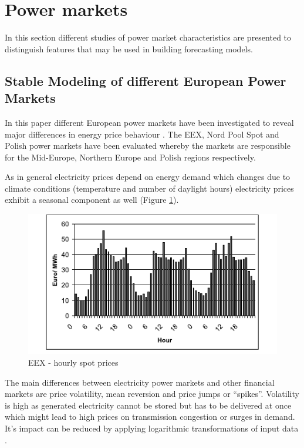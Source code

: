 
\section{Power markets}

In this section different studies of power market characteristics are presented to distinguish features that may be used in building forecasting models. 

\subsection{Stable Modeling of different European Power Markets}

In this paper different European power markets have been investigated to reveal major differences in energy price behaviour \cite{mugele2005stable}. The EEX, Nord Pool Spot and Polish power markets have been evaluated whereby the markets are responsible for the Mid-Europe, Northern Europe and Polish regions respectively. 

As in general electricity prices depend on energy demand \cite{weron2005forecasting} which changes due to climate conditions (temperature and number of daylight hours) electricity prices exhibit a seasonal component as well (Figure \ref{fig:seasonal_behaviour_of_eex_prices}). 

\begin{figure}[htbp]
	\centering
		\includegraphics{figures/state_of_the_art/seasonal_behaviour_of_eex_prices.PNG}
	\caption{EEX - hourly spot prices \cite{mugele2005stable}}
	\label{fig:seasonal_behaviour_of_eex_prices}
\end{figure}

The main differences between electricity power markets and other financial markets are price volatility, mean reversion and price jumps or "`spikes"'. Volatility is high as generated electricity cannot be stored but has to be delivered at once which might lead to high prices on transmission congestion or surges in demand. It's impact can be reduced by applying logarithmic transformations of input data \cite{weron2005forecasting}. 

